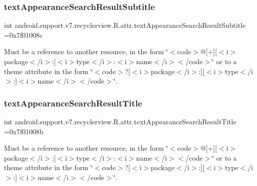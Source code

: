 \subsubsection{\texorpdfstring{text\+Appearance\+Search\+Result\+Subtitle}{textAppearanceSearchResultSubtitle}}
{\footnotesize\ttfamily int android.\+support.\+v7.\+recyclerview.\+R.\+attr.\+text\+Appearance\+Search\+Result\+Subtitle =0x7f01008c\hspace{0.3cm}{\ttfamily [static]}}

Must be a reference to another resource, in the form \char`\"{}$<$code$>$@\mbox{[}+\mbox{]}\mbox{[}$<$i$>$package$<$/i$>$\+:\mbox{]}$<$i$>$type$<$/i$>$\+:$<$i$>$name$<$/i$>$$<$/code$>$\char`\"{} or to a theme attribute in the form \char`\"{}$<$code$>$?\mbox{[}$<$i$>$package$<$/i$>$\+:\mbox{]}\mbox{[}$<$i$>$type$<$/i$>$\+:\mbox{]}$<$i$>$name$<$/i$>$$<$/code$>$\char`\"{}. \mbox{\label{classandroid_1_1support_1_1v7_1_1recyclerview_1_1R_1_1attr_ae06ead368e03a644835f43cb7660d3cb}} 
\subsubsection{\texorpdfstring{text\+Appearance\+Search\+Result\+Title}{textAppearanceSearchResultTitle}}
{\footnotesize\ttfamily int android.\+support.\+v7.\+recyclerview.\+R.\+attr.\+text\+Appearance\+Search\+Result\+Title =0x7f01008b\hspace{0.3cm}{\ttfamily [static]}}

Must be a reference to another resource, in the form \char`\"{}$<$code$>$@\mbox{[}+\mbox{]}\mbox{[}$<$i$>$package$<$/i$>$\+:\mbox{]}$<$i$>$type$<$/i$>$\+:$<$i$>$name$<$/i$>$$<$/code$>$\char`\"{} or to a theme attribute in the form \char`\"{}$<$code$>$?\mbox{[}$<$i$>$package$<$/i$>$\+:\mbox{]}\mbox{[}$<$i$>$type$<$/i$>$\+:\mbox{]}$<$i$>$name$<$/i$>$$<$/code$>$\char`\"{}. \mbox{\label{classandroid_1_1support_1_1v7_1_1recyclerview_1_1R_1_1attr_a053f1e5eb304215bffc41b7246a53a2c}} 
